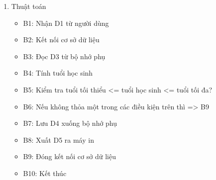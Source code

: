 \documentclass[a4paper]{article}
\begin{document}
\begin{enumerate}[label=\alph*.]
\item Thuật toán
\begin{itemize}
\item B1: Nhận D1 từ người dùng
\item B2: Kết nối cơ sở dữ liệu
\item B3: Đọc D3 từ bộ nhớ phụ
\item B4: Tính tuổi học sinh
\item B5: Kiểm tra tuổi tối thiểu <= tuổi học sinh <= tuổi tối đa?
\item B6: Nếu không thỏa một trong các điều kiện trên thì => B9
\item B7: Lưu D4 xuống bộ nhớ phụ
\item B8: Xuất D5 ra máy in
\item B9: Đóng kết nối cơ sở dữ liệu
\item B10: Kết thúc
\end{itemize}

\end{enumerate}		
		
\end{document}
